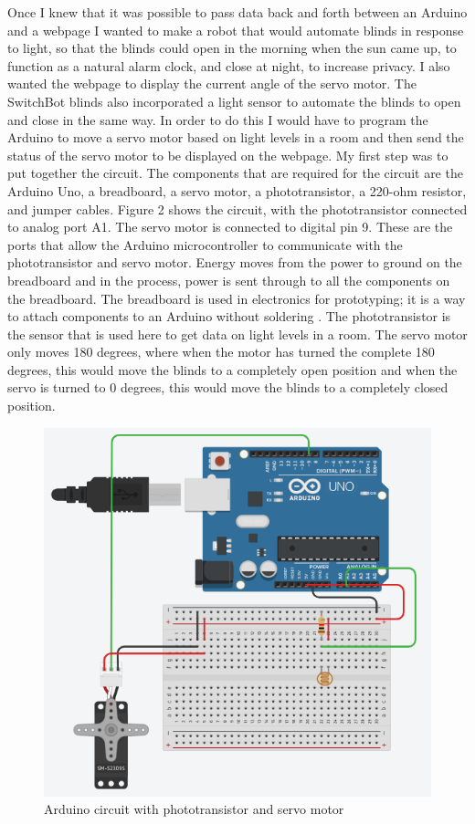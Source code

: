 \documentclass[10pt,twocolumn]{article}
\begin{document}
Once I knew that it was possible to pass data back and forth between an Arduino and a webpage I wanted to make a robot that would automate blinds in response to light, so that the blinds could open in the morning when the sun came up, to function as a natural alarm clock, and close at night, to increase privacy. I also wanted the webpage to display the current angle of the servo motor. The SwitchBot blinds also incorporated a light sensor to automate the blinds to  open and close in the same way. In order to do this I would have to program the Arduino to move a servo motor based on light levels in a room and then send the status of the servo motor to be displayed on the webpage. My first step was to put together the circuit. The components that are required for the circuit are the Arduino Uno, a breadboard, a servo motor, a phototransistor, a 220-ohm resistor, and jumper cables. Figure 2 shows the circuit, with the phototransistor connected to analog port A1. The servo motor is connected to digital pin 9. These are the ports that allow the Arduino microcontroller to communicate with the phototransistor and servo motor. Energy moves from the power to ground on the breadboard and in the process, power is sent through to all the components on the breadboard. The breadboard is used in electronics for prototyping; it is a way to attach components to an Arduino without soldering \cite{Fitzgerald2015Arduino}. The phototransistor is the sensor that is used here to get data on light levels in a room. The servo motor only moves 180 degrees, where when the motor has turned the complete 180 degrees, this would move the blinds to a completely open position and when the servo is turned to 0 degrees, this would move the blinds to a completely closed position. 

\begin{figure}
    \centering
    \includegraphics[width=.95\linewidth]{Figure 2.png}
    \caption{
        Arduino circuit with phototransistor and servo motor
    }
    \label{fig:fig2}
\end{figure}
\end{document}
